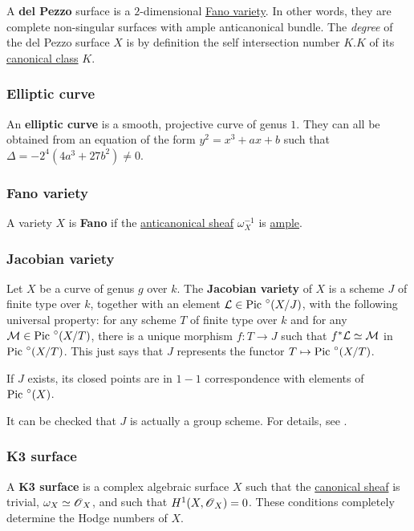 \documentclass[11pt, english]{article}
\begin{document}
A \textbf{del Pezzo} surface is a $2$-dimensional \hyperref[fano]{Fano variety}. In other words, they are complete non-singular surfaces with ample anticanonical bundle. The \emph{degree} of the del Pezzo surface $X$ is by definition the self intersection number $K.K$ of its \hyperref[canonicaldivisor]{canonical class} $K$. 

\subsubsection{Elliptic curve}
\label{ellipticc}

An \textbf{elliptic curve} is a smooth, projective curve of genus $1$. They can all be obtained from an equation of the form $y^2=x^3+ax+b$ such that $\Delta = -2^4(4a^3+27b^2) \neq 0$. 

\subsubsection{Fano variety}
\label{fano}

A variety $X$ is \textbf{Fano} if the \hyperref[anticanonical]{anticanonical  sheaf} $\omega_X^{-1}$ is \hyperref[amplelinebundle]{ample}.  

\subsubsection{Jacobian variety}
\label{jacobianvariety}

Let $X$ be a curve of genus $g$ over $k$. The \textbf{Jacobian variety} of $X$ is a scheme $J$ of finite type over $k$, together with an element $\mathcal{L} \in \text{Pic }^\circ(X/J)$, with the following universal property: for any scheme $T$ of finite type over $k$ and for any $\mathcal M \in \text{Pic }^\circ(X/T)$, there is a unique morphism $f:T \to J$ such that $f^\ast \mathcal{L} \simeq \mathcal M$ in $\text{Pic }^\circ (X/T)$. This just says that $J$ represents the functor $T \mapsto \text{Pic }^\circ(X/T)$. 

If $J$ exists, its closed points are in $1-1$ correspondence with elements of $\text{Pic }^\circ (X)$.

It can be checked that $J$ is actually a group scheme. For details, see \cite[Ch. IV.4]{hartshorne}.

\subsubsection{K3 surface}
\label{k3}

A \textbf{K3 surface} is a complex algebraic surface $X$ such that the \hyperref[canonicaldivisor]{canonical sheaf} is trivial, $\omega_X \simeq \operatorname{\mathscr{O}}_X$, and such that $H^1(X,\operatorname{\mathscr{O}}_X)=0$. These conditions completely determine the Hodge numbers of $X$.
\end{document}
